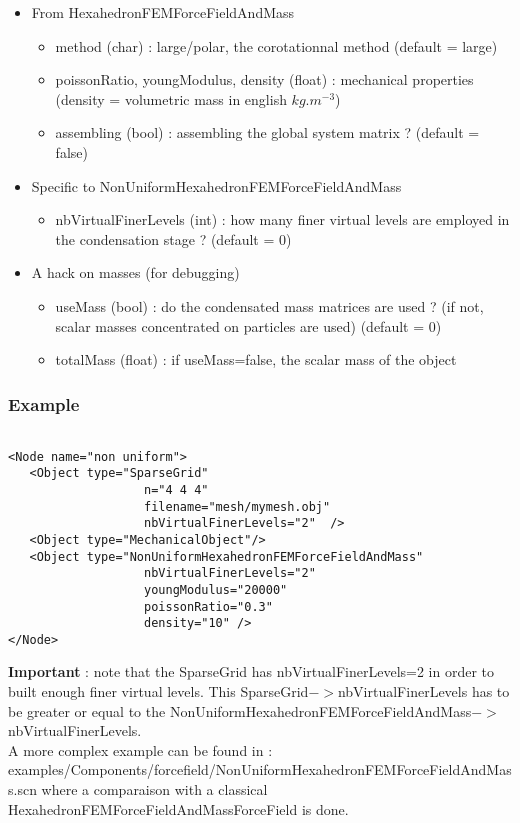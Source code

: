 \begin{itemize}
\item From HexahedronFEMForceFieldAndMass
	\begin{itemize}
	\item method (char) : large/polar, the corotationnal method (default = large)
	\item poissonRatio, youngModulus, density (float) : mechanical properties (density = volumetric mass in english $kg.m^{-3}$)
	\item assembling (bool) : assembling the global system matrix ? (default = false)
	\end{itemize}
\item Specific to NonUniformHexahedronFEMForceFieldAndMass
	\begin{itemize}
	\item nbVirtualFinerLevels (int) : how many finer virtual levels are employed in the condensation stage ? (default = 0)
	\end{itemize}
\item A hack on masses (for debugging)
		\begin{itemize}
	\item useMass (bool) : do the condensated mass matrices are used ? (if not, scalar masses concentrated on particles are used) (default = 0)
	\item totalMass (float) : if useMass=false, the scalar mass of the object
	\end{itemize}
\end{itemize}


\subsubsection{Example}



\begin{verbatim}

<Node name="non uniform">
   <Object type="SparseGrid"
                   n="4 4 4"
                   filename="mesh/mymesh.obj"
                   nbVirtualFinerLevels="2"  />
   <Object type="MechanicalObject"/>
   <Object type="NonUniformHexahedronFEMForceFieldAndMass"
                   nbVirtualFinerLevels="2"
                   youngModulus="20000"
                   poissonRatio="0.3"
                   density="10" />
</Node>

\end{verbatim}

\textbf{Important} : note that the SparseGrid has nbVirtualFinerLevels=2 in order to built enough finer virtual levels. This SparseGrid$->$nbVirtualFinerLevels has to be greater or equal to the NonUniformHexahedronFEMForceFieldAndMass$->$nbVirtualFinerLevels.
\\

A more complex example can be found in : examples/Components/forcefield/NonUniformHexahedronFEMForceFieldAndMass.scn where a comparaison with a classical HexahedronFEMForceFieldAndMassForceField is done.

